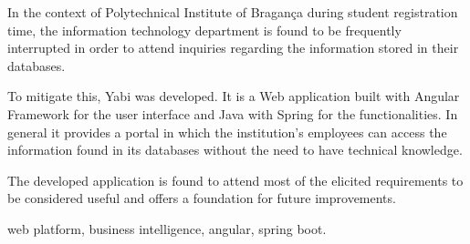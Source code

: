 In the context of Polytechnical Institute of Bragança during student registration time, the information technology department is found to be frequently interrupted in order to attend inquiries regarding the information stored in their databases.

To mitigate this, Yabi was developed. It is a Web application built with Angular Framework for the user interface and Java with Spring for the functionalities. In general it provides a portal in which the institution's employees can access the information found in its databases without the need to have technical knowledge.

The developed application is found to attend most of the elicited requirements to be considered useful and offers a foundation for future improvements.


\mbox{}\linebreak
{} web platform, business intelligence, angular, spring boot.

